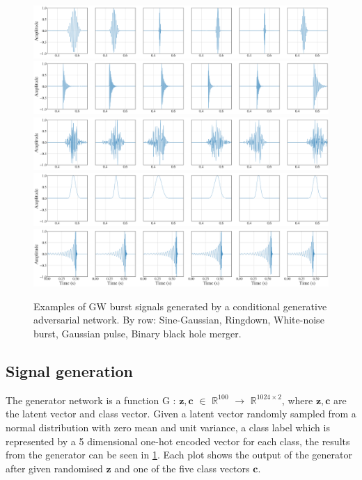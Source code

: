 \documentclass[12pt]{iopart}
\begin{document}
\begin{figure}
    \centering
    \includegraphics[width=\textwidth]{figures/generations/sg.png}
    \includegraphics[width=\textwidth]{figures/generations/rd.png}
    \includegraphics[width=\textwidth]{figures/generations/wnb.png}
    \includegraphics[width=\textwidth]{figures/generations/blip.png}
    \includegraphics[width=\textwidth]{figures/generations/bbh.png}
    \caption{Examples of \ac{GW} burst signals generated by a conditional generative adversarial network. By row: Sine-Gaussian, Ringdown,
White-noise burst, Gaussian pulse, Binary black hole merger.}
\label{fig:gen_signals} \end{figure}

\subsection{Signal generation}
The generator network is a function G : $\mathbf{z},\mathbf{c} $ $\in$ $\mathbb{R}^{100}$ $\to$ $\mathbb{R}^{1024\times2}$, where $\mathbf{z},\mathbf{c}$ are the latent vector and class vector. Given a latent vector randomly sampled from a normal distribution with zero mean and unit variance, a class label which is represented by a 5 dimensional one-hot encoded vector for each class, the results from the generator can be seen in \cref{fig:gen_signals}. Each plot shows the output of the generator after given randomised $\mathbf{z}$ and one of the five class vectors $\mathbf{c}$.
\end{document}
